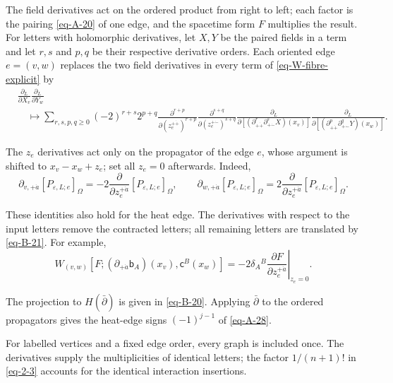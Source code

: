 \documentclass[11pt]{article}
\numberwithin{equation}{section}
\numberwithin{figure}{section}
\numberwithin{table}{section}
\begin{document}
The field derivatives act on the ordered product from right to left; each factor is the pairing \eqref{eq-A-20} of one edge, and the spacetime form $F$ multiplies the result. For letters with holomorphic derivatives, let $X,Y$ be the paired fields in a term and let $r,s$ and $p,q$ be their respective derivative orders. Each oriented edge $e=(v,w)$ replaces the two field derivatives in every term of \eqref{eq-W-fibre-explicit} by
\begin{equation}\label{eq-W-jet-edge}
\begin{aligned}
&\frac{\partial_L}{\partial X_v}
\frac{\partial_L}{\partial Y_w}\\
&\quad\longmapsto
\sum_{r,s,p,q\ge0}(-2)^{r+s}2^{p+q}
\frac{\partial^{r+p}}{\partial(z_e^{+\dot+})^{r+p}}
\frac{\partial^{s+q}}{\partial(z_e^{+\dot-})^{s+q}}
\frac{\partial_L}
 {\partial[(\partial_{+\dot+}^{r}\partial_{+\dot-}^{s}X)(x_v)]}
\frac{\partial_L}
 {\partial[(\partial_{+\dot+}^{p}\partial_{+\dot-}^{q}Y)(x_w)]}.
\end{aligned}
\end{equation}

The $z_e$ derivatives act only on the propagator of the edge $e$, whose argument is shifted to $x_v-x_w+z_e$; set all $z_e=0$ afterwards. Indeed,
\begin{equation*}
\partial_{v,+\dot a}[P_{\varepsilon,L;e}]_\Omega
=-2\frac{\partial}{\partial z_e^{+\dot a}}[P_{\varepsilon,L;e}]_\Omega,
\qquad
\partial_{w,+\dot a}[P_{\varepsilon,L;e}]_\Omega
=2\frac{\partial}{\partial z_e^{+\dot a}}[P_{\varepsilon,L;e}]_\Omega.
\end{equation*}

These identities also hold for the heat edge. The derivatives with respect to the input letters remove the contracted letters; all remaining letters are translated by \eqref{eq-B-21}. For example,
\begin{equation*}
W_{(v,w)}[F;(\partial_{+\dot a}\mathsf b_A)(x_v),
\mathsf c^B(x_w)]
=-2\delta_A{}^B\left.
\frac{\partial F}{\partial z_e^{+\dot a}}\right|_{z_e=0}.
\end{equation*}

The projection to $H(\bar\partial)$ is given in \eqref{eq-B-20}. Applying $\bar\partial$ to the ordered propagators gives the heat-edge signs $(-1)^{j-1}$ of \eqref{eq-A-28}.

For labelled vertices and a fixed edge order, every graph is included once. The derivatives supply the multiplicities of identical letters; the factor $1/(n+1)!$ in \eqref{eq-2-3} accounts for the identical interaction insertions.
\end{document}
